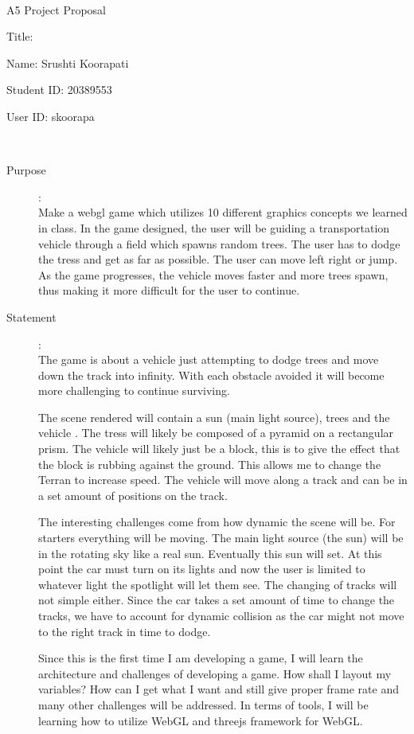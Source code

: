 \documentclass {article}
\begin{document}
~\vfill
\begin{center}
\Large

A5 Project Proposal

Title:

Name: Srushti Koorapati

Student ID: 20389553

User ID: skoorapa
\end{center}
\vfill ~\vfill~
\newpage
{}
\begin{description}
\item[Purpose]:\\
Make a webgl game which utilizes 10 different graphics concepts we learned in class. 
In the game designed, the user will be guiding a transportation vehicle through a field which spawns random trees. 
The user has to dodge the tress and get as far as possible. The user can move left right or jump. 
As the game progresses, the vehicle moves faster and more trees spawn, thus making it more difficult for the user to continue.

\item[Statement]:\\
The game is about a vehicle just attempting to dodge trees and move down the track into infinity. With each obstacle avoided it will become more challenging to continue surviving.   

The scene rendered will contain a sun (main light source), trees and the vehicle . The tress will likely be composed of a pyramid on a rectangular prism.
The vehicle will likely just be a block, this is to give the effect that the block is rubbing against the ground. This allows me to change the Terran to increase speed. 
The vehicle will move along a track and can be in a set amount of positions on the track. 

The interesting challenges come from how dynamic the scene will be. For starters everything will be moving. The main light source (the sun) will be in the rotating sky like a real sun. Eventually this sun will set. At this point the car must turn on its lights and now the user is limited to whatever light the spotlight will let them see. The changing of tracks will not simple either. Since the car takes a set amount of time to change the tracks, we have to account for dynamic collision as the car might not move to the right track in time to dodge. 

Since this is the first time I am developing a game, I will learn the architecture and challenges of developing a game. How shall I layout my variables? How can I get what I want and still give proper frame rate and many other challenges will be addressed. In terms of tools, I will be learning how to utilize WebGL and threejs framework for WebGL.


\end{description}
\end{document}
